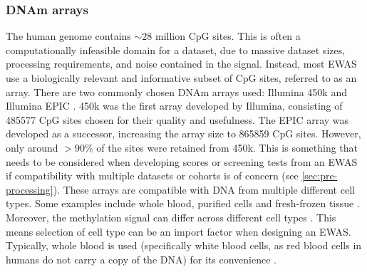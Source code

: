\documentclass{article} %
\begin{document}
\subsubsection{DNAm arrays}
The human genome contains \(\sim\!28\) million CpG sites. This is often a computationally infeasible domain for a dataset, due to massive dataset sizes, processing requirements, and noise contained in the signal. Instead, most EWAS use a biologically relevant and informative subset of CpG sites, referred to as an array. There are two commonly chosen DNAm arrays used: Illumina 450k \cite{illumina2012methylation450} and Illumina EPIC \cite{illumina2015methylationepic}. 450k was the first array developed by Illumina, consisting of \num{485577} CpG sites chosen for their quality and usefulness. The EPIC array was developed as a successor, increasing the array size to \num{865859} CpG sites. However, only around \(>90\%\) of the sites were retained from 450k. This is something that needs to be considered when developing scores or screening tests from an EWAS if compatibility with multiple datasets or cohorts is of concern (see \ref{sec:pre-processing}). These arrays are compatible with DNA from multiple different cell types. Some examples include whole blood, purified cells and fresh-frozen tissue \cite{bhat2022data}. Moreover, the methylation signal can differ across different cell types \cite{huang2016epigenome}. This means selection of cell type can be an import factor when designing an EWAS. Typically, whole blood is used (specifically white blood cells, as red blood cells in humans do not carry a copy of the DNA) for its convenience \cite{houseman2015dna}.

\end{document}

